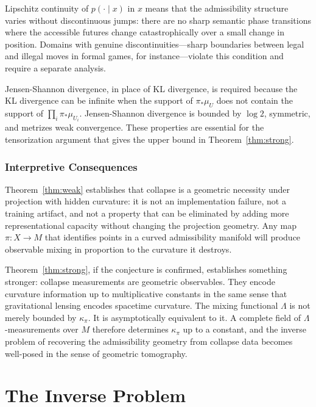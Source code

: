 \documentclass[12pt, oneside]{book}
\theoremstyle{plain-flyxion}
\theoremstyle{definition-flyxion}
\newcommand{\kpi}{\kappa_{\pi}}
\newcommand{\Lam}{\Lambda}
\begin{document}
Lipschitz continuity of $p(\cdot\mid x)$ in $x$ means that the admissibility structure
varies without discontinuous jumps: there are no sharp semantic phase transitions where
the accessible futures change catastrophically over a small change in position. Domains
with genuine discontinuities---sharp boundaries between legal and illegal moves in formal
games, for instance---violate this condition and require a separate analysis.

Jensen-Shannon divergence, in place of KL divergence, is required because the KL
divergence can be infinite when the support of $\pi_*\mu_U$ does not contain the support
of $\prod_i \pi_*\mu_{U_i}$. Jensen-Shannon divergence is bounded by $\log 2$,
symmetric, and metrizes weak convergence. These properties are essential for the
tensorization argument that gives the upper bound in Theorem~\ref{thm:strong}.

\section{Interpretive Consequences}

Theorem~\ref{thm:weak} establishes that collapse is a geometric necessity under
projection with hidden curvature: it is not an implementation failure, not a training
artifact, and not a property that can be eliminated by adding more representational
capacity without changing the projection geometry. Any map $\pi: X\to M$ that identifies
points in a curved admissibility manifold will produce observable mixing in proportion to
the curvature it destroys.

Theorem~\ref{thm:strong}, if the conjecture is confirmed, establishes something stronger:
collapse measurements are geometric observables. They encode curvature information up to
multiplicative constants in the same sense that gravitational lensing encodes spacetime
curvature. The mixing functional $\Lam$ is not merely bounded by $\kpi$. It is
asymptotically equivalent to it. A complete field of $\Lam$-measurements over $M$
therefore determines $\kpi$ up to a constant, and the inverse problem of recovering the
admissibility geometry from collapse data becomes well-posed in the sense of geometric
tomography.

\part{The Inverse Problem}
\end{document}
